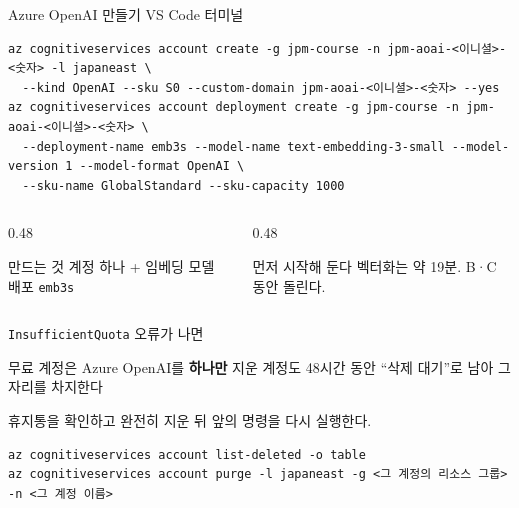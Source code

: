 \begin{frame}[fragile]{ Azure OpenAI 만들기}
VS Code 터미널 
\vspace{0.4em}
\begin{Verbatim}
az cognitiveservices account create -g jpm-course -n jpm-aoai-<이니셜>-<숫자> -l japaneast \
  --kind OpenAI --sku S0 --custom-domain jpm-aoai-<이니셜>-<숫자> --yes
az cognitiveservices account deployment create -g jpm-course -n jpm-aoai-<이니셜>-<숫자> \
  --deployment-name emb3s --model-name text-embedding-3-small --model-version 1 --model-format OpenAI \
  --sku-name GlobalStandard --sku-capacity 1000
\end{Verbatim}
\vspace{0.6em}
\begin{columns}[T]
\begin{column}{0.48\textwidth}
\begin{block}{만드는 것}
\small 계정 하나 + 임베딩 모델 배포 \texttt{emb3s}\\
\end{block}
\end{column}
\begin{column}{0.48\textwidth}
\begin{alertblock}{먼저 시작해 둔다}
\small 벡터화는 \num{약 19분}. B·C 동안 돌린다.
\end{alertblock}
\end{column}
\end{columns}
\end{frame}

\begin{frame}[fragile]{ \texttt{InsufficientQuota} 오류가 나면}
\begin{alertblock}{무료 계정은 Azure OpenAI를 \textbf{하나만}}
지운 계정도 \num{48시간} 동안 ``삭제 대기''로 남아 그 자리를 차지한다\\
\src{(예: 연습으로 만들었다 지운 계정)}
\end{alertblock}
\vspace{0.4em}
휴지통을 확인하고 완전히 지운 뒤 앞의 명령을 다시 실행한다.
\vspace{0.4em}
\begin{Verbatim}
az cognitiveservices account list-deleted -o table
az cognitiveservices account purge -l japaneast -g <그 계정의 리소스 그룹> -n <그 계정 이름>
\end{Verbatim}
\end{frame}

